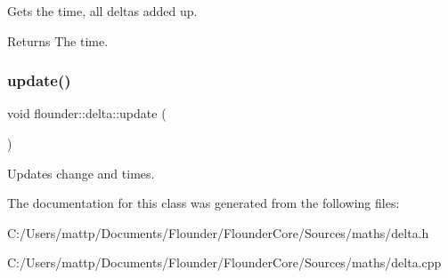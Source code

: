 Gets the time, all deltas added up. 

\begin{DoxyReturn}{Returns}
The time. 
\end{DoxyReturn}
\mbox{\label{classflounder_1_1delta_a6f87fd0b76d229ec490a07a565c2afd0}} 
\subsubsection{\texorpdfstring{update()}{update()}}
{\footnotesize\ttfamily void flounder\+::delta\+::update (\begin{DoxyParamCaption}{ }\end{DoxyParamCaption})}



Updates change and times. 



The documentation for this class was generated from the following files\+:\begin{DoxyCompactItemize}
\item 
C\+:/\+Users/mattp/\+Documents/\+Flounder/\+Flounder\+Core/\+Sources/maths/delta.\+h\item 
C\+:/\+Users/mattp/\+Documents/\+Flounder/\+Flounder\+Core/\+Sources/maths/delta.\+cpp\end{DoxyCompactItemize}
